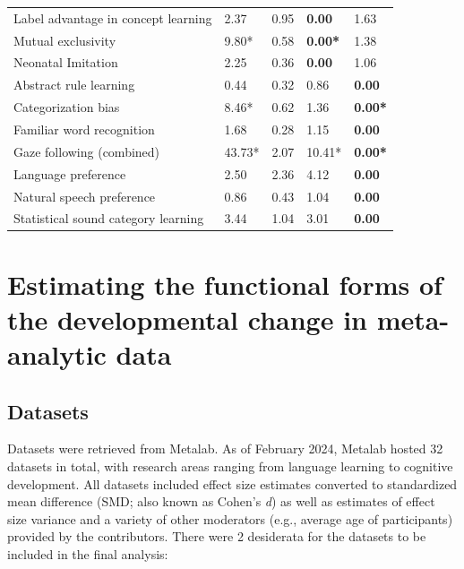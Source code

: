 \documentclass[
  man]{apa6}
\begin{document}
\begin{table}[hbt]
\begin{center}
\begin{threeparttable}
\begin{tabular}{lllll}
Label advantage in concept learning & 2.37 & 0.95 & \bf{0.00} & 1.63\\
Mutual exclusivity & 9.80* & 0.58 & \bf{0.00*} & 1.38\\
Neonatal Imitation & 2.25 & 0.36 & \bf{0.00} & 1.06\\
Abstract rule learning & 0.44 & 0.32 & 0.86 & \bf{0.00}\\
Categorization bias & 8.46* & 0.62 & 1.36 & \bf{0.00*}\\
Familiar word recognition & 1.68 & 0.28 & 1.15 & \bf{0.00}\\
Gaze following (combined) & 43.73* & 2.07 & 10.41* & \bf{0.00*}\\
Language preference & 2.50 & 2.36 & 4.12 & \bf{0.00}\\
Natural speech preference & 0.86 & 0.43 & 1.04 & \bf{0.00}\\
Statistical sound category learning & 3.44 & 1.04 & 3.01 & \bf{0.00}\\
\bottomrule
\end{tabular}

\end{threeparttable}
\end{center}

\end{table}
\efloatseparator

\hypertarget{estimating-the-functional-forms-of-the-developmental-change-in-meta-analytic-data}{%
\section{Estimating the functional forms of the developmental change in meta-analytic data}\label{estimating-the-functional-forms-of-the-developmental-change-in-meta-analytic-data}}

\hypertarget{datasets}{%
\subsection{Datasets}\label{datasets}}

Datasets were retrieved from Metalab. As of February 2024, Metalab hosted 32 datasets in total, with research areas ranging from language learning to cognitive development. All datasets included effect size estimates converted to standardized mean difference (SMD; also known as Cohen's \emph{d}) as well as estimates of effect size variance and a variety of other moderators (e.g., average age of participants) provided by the contributors. There were 2 desiderata for the datasets to be included in the final analysis:
\end{document}
